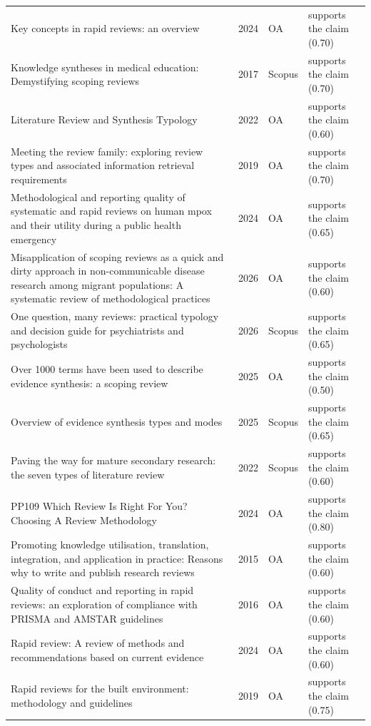 \begin{longtable}{@{}%
  >{\raggedright\arraybackslash}p{}c%
  >{\raggedright\arraybackslash}p{}%
  >{\raggedright\arraybackslash}p{}@{}}
Key concepts in rapid reviews: an overview & 2024 & OA & supports the claim (0.70) \\
Knowledge syntheses in medical education: Demystifying scoping reviews & 2017 & Scopus & supports the claim (0.70) \\
Literature Review and Synthesis Typology & 2022 & OA & supports the claim (0.60) \\
Meeting the review family: exploring review types and associated information retrieval requirements & 2019 & OA & supports the claim (0.70) \\
Methodological and reporting quality of systematic and rapid reviews on human mpox and their utility during a public health emergency & 2024 & OA & supports the claim (0.65) \\
Misapplication of scoping reviews as a quick and dirty approach in non-communicable disease research among migrant populations: A systematic review of methodological practices & 2026 & OA & supports the claim (0.60) \\
One question, many reviews: practical typology and decision guide for psychiatrists and psychologists & 2026 & Scopus & supports the claim (0.65) \\
Over 1000 terms have been used to describe evidence synthesis: a scoping review & 2025 & OA & supports the claim (0.50) \\
Overview of evidence synthesis types and modes & 2025 & Scopus & supports the claim (0.65) \\
Paving the way for mature secondary research: the seven types of literature review & 2022 & Scopus & supports the claim (0.60) \\
PP109 Which Review Is Right For You? Choosing A Review Methodology & 2024 & OA & supports the claim (0.80) \\
Promoting knowledge utilisation, translation, integration, and application in practice: Reasons why to write and publish research reviews & 2015 & OA & supports the claim (0.60) \\
Quality of conduct and reporting in rapid reviews: an exploration of compliance with PRISMA and AMSTAR guidelines & 2016 & OA & supports the claim (0.60) \\
Rapid review: A review of methods and recommendations based on current evidence & 2024 & OA & supports the claim (0.60) \\
Rapid reviews for the built environment: methodology and guidelines & 2019 & OA & supports the claim (0.75) \\

\end{longtable}
